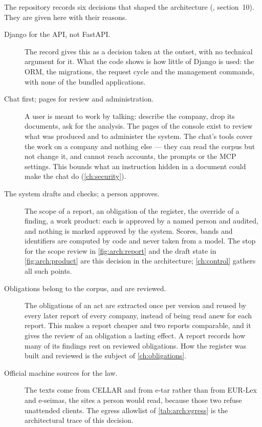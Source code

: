 The repository records six decisions that shaped the architecture
(, section~10). They are given here with their reasons.

\begin{description}
  \item[Django for the API, not FastAPI.] The record gives this as a decision taken at the
    outset, with no technical argument for it. What the
    code shows is how little of Django is used: the ORM, the migrations, the request cycle
    and the management commands, with none of the bundled applications.

  \item[Chat first; pages for review and administration.] A user is meant to work by
    talking: describe the company, drop its documents, ask for the analysis. The pages of
    the console exist to review what was produced and to administer the system. The chat's
    tools cover the work on a company and nothing else --- they can read the corpus but not
    change it, and cannot reach accounts, the prompts or the MCP settings. This bounds what an instruction hidden in a
    document could make the chat do (\cref{ch:security}).

  \item[The system drafts and checks; a person approves.] The scope of a report, an
    obligation of the register, the override of a finding, a work product: each is approved
    by a named person and audited, and nothing is marked approved by the system. Scores,
    bands and identifiers are computed by code and never taken from a model. The stop for
    the scope review in \cref{fig:arch:report} and the draft state in
    \cref{fig:arch:product} are this decision in the architecture; \cref{ch:control} gathers
    all such points.

  \item[Obligations belong to the corpus, and are reviewed.] The obligations of an act are
    extracted once per version and reused by every later report of every company, instead of
    being read anew for each report. This makes a report cheaper and two reports
    comparable, and it gives the review of an obligation a lasting effect. A report records
    how many of its findings rest on reviewed obligations. How the register was built and
    reviewed is the subject of \cref{ch:obligations}.

  \item[Official machine sources for the law.] The texts come from CELLAR and from e-tar
    rather than from EUR-Lex and e-seimas, the sites a person would read, because those two
    refuse unattended clients. The egress allowlist of \cref{tab:arch:egress} is the
    architectural trace of this decision.


\end{description}
